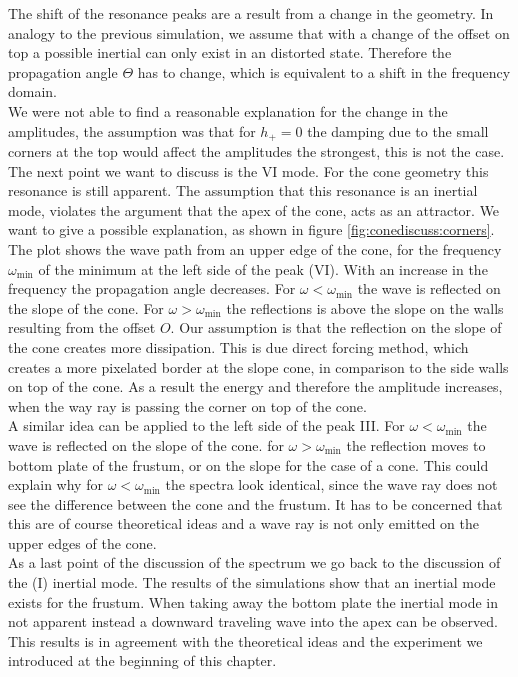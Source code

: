 {The shift of the resonance peaks are a result from a change in the geometry.
In analogy to the previous simulation, we assume that with a change of the offset on top
a possible inertial can only exist in an distorted state. Therefore the propagation angle $\Theta$ has to change,
which is equivalent to a shift in the frequency domain.\\
We were not able to find a reasonable explanation for the change in the amplitudes,
the assumption was that for $h_+=0$ the damping due to the small corners at the top
would affect the amplitudes the strongest, this is not the case.\\
The next point we want to discuss is the \RN{6} mode.
For the cone geometry this resonance is still apparent.
The assumption that this resonance is an inertial mode,
violates the argument that the apex of the cone, acts as
an attractor.
We want to give a possible explanation, as shown in figure \ref{fig:conediscuss:corners}.
The plot shows the wave path from an upper edge of the cone, for the frequency $\omega_{\text{min}}$
of the minimum at the left side of the peak (\RN{6}).
With an increase in the frequency the propagation angle decreases.
For $\omega<\omega_{\text{min}}$ the wave is reflected on the slope of the cone.
For $\omega>\omega_{\text{min}}$ the reflections is above the slope on the walls resulting from the offset $O$.
Our assumption is that the reflection on the slope of the cone creates more dissipation.
This is due direct forcing method, which creates a more pixelated border at the slope cone,
in comparison to the side walls on top of the cone.
As a result the energy and therefore the amplitude increases,
when the way ray is passing the corner on top of the cone.\\
A similar idea can be applied to the left side of the peak \RN{3}.
For $\omega<\omega_{\text{min}}$ the wave is reflected on the slope of the cone.
for  $\omega>\omega_{\text{min}}$ the reflection moves to bottom plate of the frustum,
or on the slope for the case of a cone.
This could explain why for $\omega<\omega_{\text{min}}$  the spectra look identical,
since the wave ray does not see the difference between the cone and the frustum.
It has to be concerned that this are of course theoretical ideas and a wave ray is not only emitted on the
upper edges of the cone.\\
As a last point of the discussion of the spectrum we go back to the discussion of the (\RN{1}) inertial mode.
The results of the simulations show that an inertial mode exists for the frustum.
When taking away the bottom plate the inertial mode in not apparent instead
a downward traveling wave into the apex can be observed.
This results is in agreement with the theoretical ideas and the experiment we introduced
at the beginning of this chapter.\\

}
